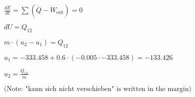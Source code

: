 \( \frac{dE}{dt} = \sum (\dot{Q} - \dot{W}_{\text{out}}) = 0 \)  

\( dU = Q_{12} \)  

\( m \cdot (u_2 - u_1) = Q_{12} \)  

\( u_1 = -333.458 + 0.6 \cdot (-0.005 \cdot -333.458) = -133.426 \)  

\( u_2 = \frac{Q_{12}}{m} \)  

\( \text{(Note: "kann sich nicht verschieben" is written in the margin)} \)